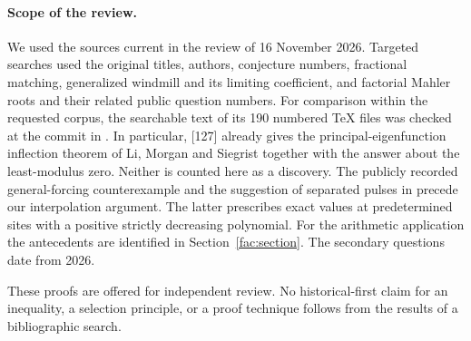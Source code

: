 \documentclass[11pt]{article}
\theoremstyle{remark}\newtheorem{remark}[theorem]{Remark}
\begin{document}
\paragraph{Scope of the review.}
We used the sources current in the review of 16 November 2026. Targeted searches used the original titles, authors, conjecture numbers, fractional matching, generalized windmill and its limiting coefficient, and factorial Mahler roots and their related public question numbers. For comparison within the requested corpus, the searchable text of its 190 numbered TeX files was checked at the commit in \cite{VMRC}. In particular, [127] already gives the principal-eigenfunction inflection theorem of Li, Morgan and Siegrist together with the answer about the least-modulus zero. Neither is counted here as a discovery. The publicly recorded general-forcing counterexample and the suggestion of separated pulses in \cite{Omega} precede our interpolation argument. The latter prescribes exact values at predetermined sites with a positive strictly decreasing polynomial. For the arithmetic application the antecedents are identified in Section~\ref{fac:section}. The secondary questions date from 2026.
\par
These proofs are offered for independent review. No historical-first claim for an inequality, a selection principle, or a proof technique follows from the results of a bibliographic search.
\end{document}

